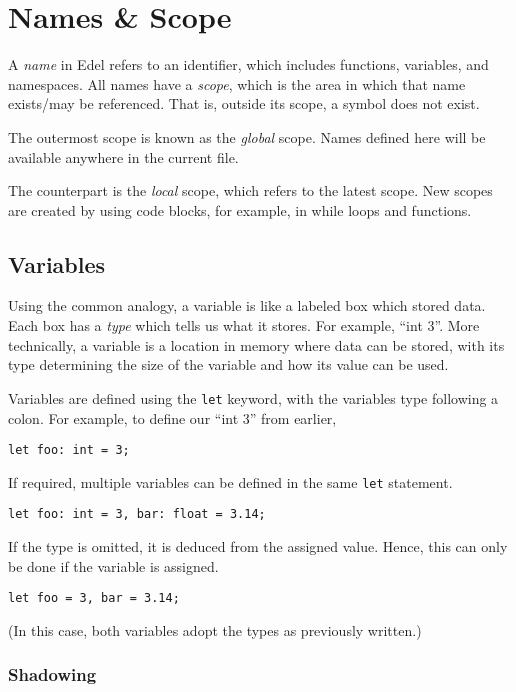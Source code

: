 \section{Names \& Scope}\label{sec:names-&-scope}

A \textit{name} in Edel refers to an identifier, which includes functions, variables, and namespaces.
All names have a \textit{scope}, which is the area in which that name exists/may be referenced.
That is, outside its scope, a symbol does not exist.

The outermost scope is known as the \textit{global} scope.
Names defined here will be available anywhere in the current file.

The counterpart is the \textit{local} scope, which refers to the latest scope.
New scopes are created by using code blocks, for example, in while loops and functions.

\subsection{Variables}\label{subsec:variables}

Using the common analogy, a variable is like a labeled box which stored data.
Each box has a \textit{type} which tells us what it stores.
For example, ``int 3''.
More technically, a variable is a location in memory where data can be stored, with its type determining the size of the variable and how its value can be used.

Variables are defined using the \texttt{let} keyword, with the variables type following a colon.
For example, to define our ``int 3'' from earlier,
\begin{lstlisting}[language=CustomLang]
let foo: int = 3;
\end{lstlisting}

If required, multiple variables can be defined in the same \texttt{let} statement.
\begin{lstlisting}[language=CustomLang]
let foo: int = 3, bar: float = 3.14;
\end{lstlisting}

If the type is omitted, it is deduced from the assigned value.
Hence, this can only be done if the variable is assigned.
\begin{lstlisting}[language=CustomLang]
let foo = 3, bar = 3.14;
\end{lstlisting}
(In this case, both variables adopt the types as previously written.)

\subsubsection{Shadowing}

